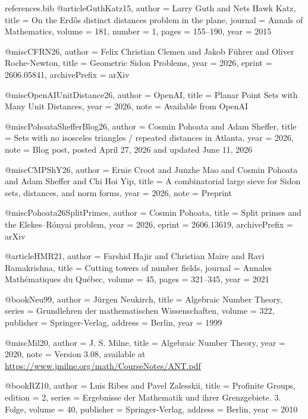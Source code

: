\begin{filecontents*}{references.bib}
@article{GuthKatz15,
  author  = {Larry Guth and Nets Hawk Katz},
  title   = {On the {E}rd{\H{o}}s distinct distances problem in the plane},
  journal = {Annals of Mathematics},
  volume  = {181},
  number  = {1},
  pages   = {155--190},
  year    = {2015}
}

@misc{CFRN26,
  author       = {Felix Christian Clemen and Jakob F\"uhrer and Oliver Roche-Newton},
  title        = {Geometric {S}idon Problems},
  year         = {2026},
  eprint       = {2606.05841},
  archivePrefix = {arXiv}
}

@misc{OpenAIUnitDistance26,
  author = {{OpenAI}},
  title  = {Planar Point Sets with Many Unit Distances},
  year   = {2026},
  note   = {Available from OpenAI}
}

@misc{PohoataShefferBlog26,
  author = {Cosmin Pohoata and Adam Sheffer},
  title  = {Sets with no isosceles triangles / repeated distances in Atlanta},
  year   = {2026},
  note   = {Blog post, posted April 27, 2026 and updated June 11, 2026}
}

@misc{CMPShY26,
  author = {Ernie Croot and Junzhe Mao and Cosmin Pohoata and Adam Sheffer and Chi Hoi Yip},
  title  = {A combinatorial large sieve for {S}idon sets, distances, and norm forms},
  year   = {2026},
  note   = {Preprint}
}

@misc{Pohoata26SplitPrimes,
  author       = {Cosmin Pohoata},
  title        = {Split primes and the {E}lekes--{R}\'onyai problem},
  year         = {2026},
  eprint       = {2606.13619},
  archivePrefix = {arXiv}
}

@article{HMR21,
  author  = {Farshid Hajir and Christian Maire and Ravi Ramakrishna},
  title   = {Cutting towers of number fields},
  journal = {Annales Mathématiques du Québec},
  volume  = {45},
  pages   = {321--345},
  year    = {2021}
}

@book{Neu99,
  author    = {J{\"u}rgen Neukirch},
  title     = {Algebraic Number Theory},
  series    = {Grundlehren der mathematischen Wissenschaften},
  volume    = {322},
  publisher = {Springer-Verlag},
  address   = {Berlin},
  year      = {1999}
}

@misc{Mil20,
  author = {J. S. Milne},
  title  = {Algebraic Number Theory},
  year   = {2020},
  note   = {Version 3.08, available at \url{https://www.jmilne.org/math/CourseNotes/ANT.pdf}}
}

@book{RZ10,
  author    = {Luis Ribes and Pavel Zalesskii},
  title     = {Profinite Groups},
  edition   = {2},
  series    = {Ergebnisse der Mathematik und ihrer Grenzgebiete. 3. Folge},
  volume    = {40},
  publisher = {Springer-Verlag},
  address   = {Berlin},
  year      = {2010}
}
\end{filecontents*}


